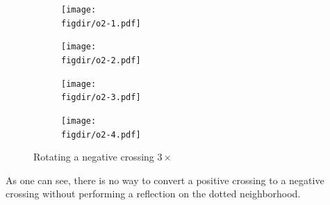 \begin{figure}[H]
  \def\figdir{figures/fundamentals/crossings}
  \centering
  \begin{subfigure}{.24\textwidth}
    \texttt{[image: \\figdir/o2-1.pdf]}
  \end{subfigure}
  \begin{subfigure}{.24\textwidth}
    \texttt{[image: \\figdir/o2-2.pdf]}
  \end{subfigure}
  \begin{subfigure}{.24\textwidth}
    \texttt{[image: \\figdir/o2-3.pdf]}
  \end{subfigure}
  \begin{subfigure}{.24\textwidth}
    \texttt{[image: \\figdir/o2-4.pdf]}
  \end{subfigure}
  \caption{Rotating a negative crossing $3\times$}
\end{figure}
As one can see, there is no way to convert a positive crossing to a
negative crossing without performing a reflection on the dotted
neighborhood.

